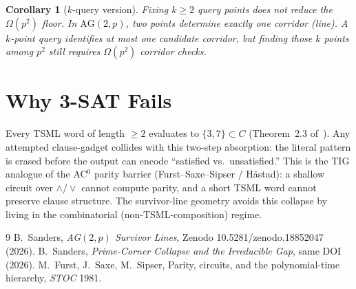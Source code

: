 \documentclass[11pt]{article}
\newtheorem{corollary}[theorem]{Corollary}
\begin{document}
\begin{corollary}[$k$-query version]
Fixing $k\ge2$ query points does not reduce the $\Omega(p^2)$ floor.
In $\mathrm{AG}(2,p)$, two points determine exactly one corridor (line).
A $k$-point query identifies at most one candidate corridor, but
\emph{finding} those $k$ points among $p^2$ still requires $\Omega(p^2)$
corridor checks.
\end{corollary}

\section{Why 3-SAT Fails}

Every TSML word of length $\ge2$ evaluates to $\{3,7\}\subset C$
(Theorem~2.3 of~\cite{wq}).
Any attempted clause-gadget collides with this two-step absorption:
the literal pattern is erased before the output can encode
``satisfied vs.\ unsatisfied.''
This is the TIG analogue of the AC$^0$ parity barrier
(Furst--Saxe--Sipser / H\aa{}stad): a shallow circuit over
$\wedge/\vee$ cannot compute parity, and a short TSML word
cannot preserve clause structure.
The survivor-line geometry avoids this collapse by
living in the combinatorial (non-TSML-composition) regime.

\begin{thebibliography}{9}
B.~Sanders, \textit{AG$(2,p)$ Survivor Lines},
Zenodo 10.5281/zenodo.18852047 (2026).
B.~Sanders, \textit{Prime-Corner Collapse and the Irreducible Gap},
same DOI (2026).
M.~Furst, J.~Saxe, M.~Sipser, Parity, circuits, and the
polynomial-time hierarchy, \textit{STOC} 1981.
\end{thebibliography}
\end{document}
